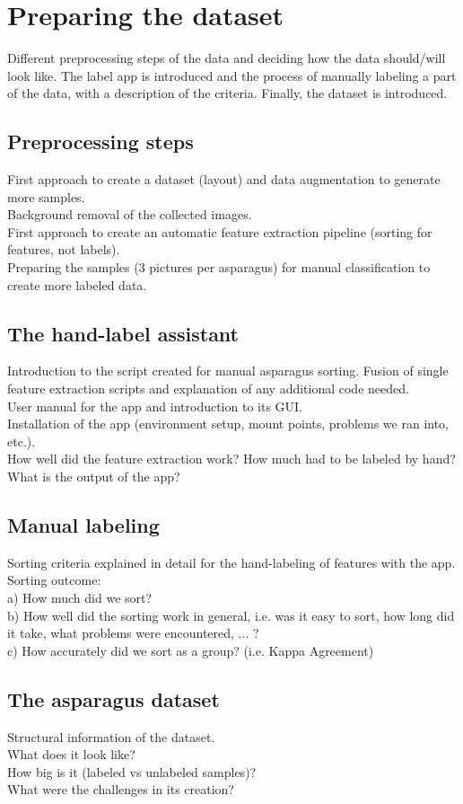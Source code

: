 \section{Preparing the dataset}

Different preprocessing steps of the data and deciding how the data should/will look like. The label app is introduced and the process of manually labeling a part of the data, with a description of the criteria. Finally, the dataset is introduced.

\subsection{Preprocessing steps}

First approach to create a dataset (layout) and data augmentation to generate more samples. \\
Background removal of the collected images. \\
First approach to create an automatic feature extraction pipeline (sorting for features, not labels). \\
Preparing the samples (3 pictures per asparagus) for manual classification to create more labeled data.

\subsection{The hand-label assistant}

Introduction to the script created for manual asparagus sorting. Fusion of single feature extraction scripts and explanation of any additional code needed. \\
User manual for the app and introduction to its GUI. \\
Installation of the app (environment setup, mount points, problems we ran into, etc.). \\
How well did the feature extraction work? How much had to be labeled by hand? What is the output of the app?


\subsection{Manual labeling}

Sorting criteria explained in detail for the hand-labeling of features with the app. \\ Sorting outcome: \\
a) How much did we sort? \\
b) How well did the sorting work in general, i.e. was it easy to sort, how long did it take, what problems were encountered, ... ? \\
c) How accurately did we sort as a group? (i.e. Kappa Agreement)

\subsection{The asparagus dataset}

Structural information of the dataset. \\
What does it look like? \\
How big is it (labeled vs unlabeled samples)? \\
What were the challenges in its creation?